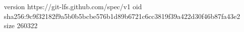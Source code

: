 version https://git-lfs.github.com/spec/v1
oid sha256:9c9f32182f9a5b0b5bcbe576b1d89b6721c6cc3819f39a422d30f46b87fa43e2
size 260322
